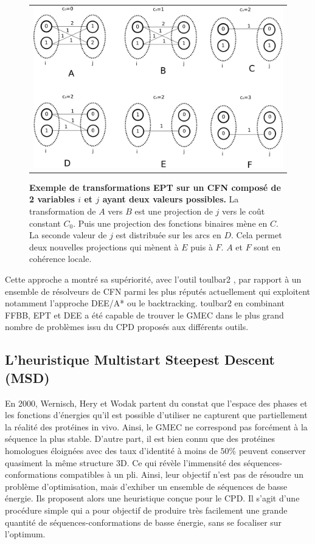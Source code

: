 \begin{figure}[!htbp]
  \centering
  \begin{tabular}{c}
    \includegraphics[width=14cm]{figure/coherences_local.png} \\
  \end{tabular}
  \caption{\textbf{Exemple de transformations EPT sur un CFN composé de 2 variables $i$ et $j$ ayant deux valeurs possibles.} La transformation de $A$ vers $B$ est une projection de $j$ vers le coût constant $C_0$. Puis une projection des fonctions binaires mène en $C$. La seconde valeur de $j$ est distribuée sur les arcs en $D$. Cela permet deux nouvelles projections qui mènent à $E$ puis à $F$. $A$ et $F$ sont en cohérence locale.}
  \label{fig:EPT}
\end{figure}

Cette approche a montré sa supériorité, avec l'outil toulbar2 \cite{Allouche14,Traore13}, par rapport à un ensemble de résolveurs de CFN parmi les plus réputés actuellement qui exploitent notamment l'approche DEE/A* ou le backtracking. toulbar2 en combinant FFBB, EPT et DEE a été capable de trouver le GMEC dans le plus grand nombre de problèmes issu du CPD proposés aux différents outils.
\subsection{L'heuristique Multistart Steepest Descent (MSD)}
\label{MSD}
En 2000, Wernisch, Hery et Wodak \cite{Wernisch00} partent du constat que l'espace des phases et les fonctions d'énergies qu'il est possible d'utiliser ne capturent que partiellement la réalité des protéines in vivo. Ainsi, le GMEC ne correspond pas forcément à la séquence la plus stable. D'autre part, il est bien connu que des protéines homologues éloignées avec des taux d'identité à moins de $50\%$ peuvent conserver quasiment la même structure 3D. Ce qui révèle l'immensité des séquences-conformations compatibles à un pli. Ainsi, leur objectif n'est pas de résoudre un problème d'optimisation, mais d'exhiber un ensemble de séquences de basse énergie. Ils proposent alors une heuristique conçue pour le CPD. Il s'agit d'une procédure simple qui a pour objectif de produire très facilement une grande quantité de séquences-conformations de basse énergie, sans se focaliser sur l'optimum.

